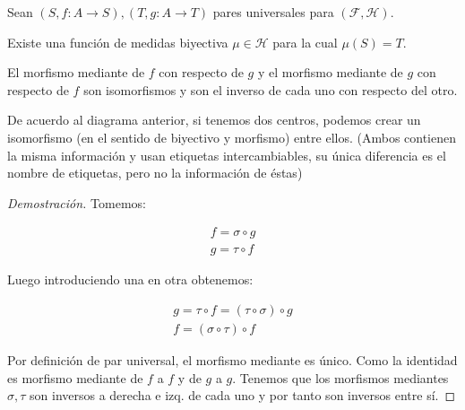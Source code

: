 \begin{thm}
	Sean $(S,f:A\to S), (T,g:A\to T)$ pares universales para $(\mathcal{F},\mathcal{H})$. 
	
	Existe una función de medidas biyectiva $\mu \in \mathcal{H}$ para la cual $\mu (S) = T$.
	
	El morfismo mediante de $f$ con respecto de $g$ y el morfismo mediante de $g$ con respecto de $f$ son isomorfismos y son el inverso de cada uno con respecto del otro.
	
	De acuerdo al diagrama anterior, si tenemos dos centros, podemos crear un isomorfismo (en el sentido de biyectivo y morfismo) entre ellos. (Ambos contienen la misma información y usan etiquetas intercambiables, su única diferencia es el nombre de etiquetas, pero no la información de éstas) 
\end{thm}

\begin{proof}[Demostración]
	Tomemos:
	
	\begin{align*}
		f = \sigma \circ g \\
		g= \tau \circ f
	\end{align*} 
	
	Luego introduciendo una en otra obtenemos:
	
	\begin{align*}
		g = \tau \circ f = (\tau \circ \sigma) \circ g \\   
		f = (\sigma \circ \tau) \circ f
	\end{align*}
	
	Por definición de par universal, el morfismo mediante es único. Como la identidad es morfismo mediante de $f$ a $f$ y de $g$ a $g$. Tenemos que los morfismos mediantes $\sigma, \tau$ son inversos a derecha e izq. de cada uno y por tanto son inversos entre sí.
\end{proof}

